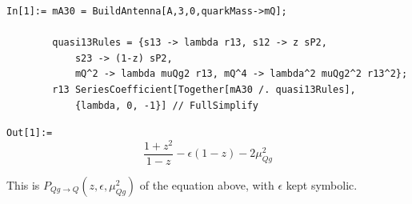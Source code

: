 \begin{mdframed}[backgroundcolor=gray!10, linewidth=0pt]
\begin{lstlisting}
In[1]:= mA30 = BuildAntenna[A,3,0,quarkMass->mQ];

        quasi13Rules = {s13 -> lambda r13, s12 -> z sP2,
            s23 -> (1-z) sP2,
            mQ^2 -> lambda muQg2 r13, mQ^4 -> lambda^2 muQg2^2 r13^2};
        r13 SeriesCoefficient[Together[mA30 /. quasi13Rules],
            {lambda, 0, -1}] // FullSimplify
\end{lstlisting}
\texttt{Out[1]:=}
    \begin{equation*}
        \frac{1+z^2}{1-z}-\epsilon(1-z)-2\mu_{Qg}^2
    \end{equation*}
\end{mdframed}
This is $P_{Qg\to Q}(z,\epsilon,\mu_{Qg}^2)$ of the equation above, with $\epsilon$ kept symbolic.


